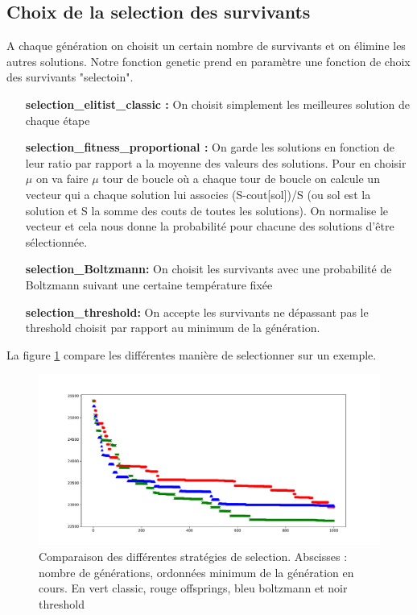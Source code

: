 \documentclass[10pt,a4paper]{article}
\begin{document}
\subsection{Choix de la selection des survivants}

A chaque génération on choisit un certain nombre de survivants et on élimine les autres solutions. Notre fonction genetic prend en paramètre une fonction de choix des survivants "selectoin". 
\begin{itemize}
\item[\textbf{selection\_elitist\_classic : }] On choisit simplement les meilleures solution de chaque étape
\item[\textbf{selection\_fitness\_proportional : }] On garde les solutions en fonction de leur ratio par rapport a la moyenne des valeurs des solutions. Pour en choisir $\mu$ on va faire $\mu$ tour de boucle où a chaque tour de boucle on calcule un vecteur qui a chaque solution lui associes (S-cout[sol])/S (ou sol est la solution et S la somme des couts de toutes les solutions). On normalise le vecteur et cela nous donne la probabilité pour chacune des solutions d'être sélectionnée. 
\item[\textbf{selection\_Boltzmann: }] On choisit les survivants avec une probabilité de Boltzmann suivant une certaine température fixée
\item[\textbf{selection\_threshold: }] On accepte les survivants ne dépassant pas le threshold choisit par rapport au minimum de la génération.
\end{itemize}

La figure \ref{compareselection} compare les différentes manière de selectionner sur un exemple. 

\begin{figure}
\centering
\includegraphics[scale=.4]{images/comparaison_genetic_selection.pdf}
\caption{Comparaison des différentes stratégies de selection. Abscisses : nombre de générations, ordonnées minimum de la génération en cours. 
En vert classic, rouge offsprings, bleu boltzmann et noir threshold}
\label{compareselection}
\end{figure}
\end{document}
